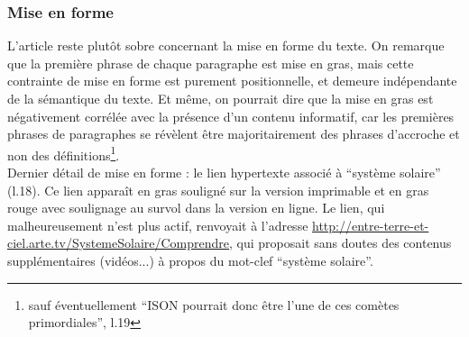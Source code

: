 \documentclass[a4paper,10pt]{article}
\begin{document}
		\subsubsection{Mise en forme}
			L'article reste plutôt sobre concernant la mise en forme du texte. On remarque que la première phrase de chaque paragraphe est mise en gras, mais cette contrainte de mise en forme est purement positionnelle, et demeure indépendante de la sémantique du texte. Et même, on pourrait dire que la mise en gras est négativement corrélée avec la présence d'un contenu informatif, car les premières phrases de paragraphes se révèlent être majoritairement des phrases d'accroche et non des définitions\footnote{sauf éventuellement ``ISON pourrait donc être l'une de ces comètes primordiales'', l.19}.\\
			Dernier détail de mise en forme : le lien hypertexte associé à ``système solaire'' (l.18). Ce lien apparaît en gras souligné sur la version imprimable et en gras rouge avec soulignage au survol dans la version en ligne. Le lien, qui malheureusement n'est plus actif, renvoyait à l'adresse \url{http://entre-terre-et-ciel.arte.tv/SystemeSolaire/Comprendre}, qui proposait sans doutes des contenus supplémentaires (vidéos...) à propos du mot-clef ``système solaire''.
\end{document}
